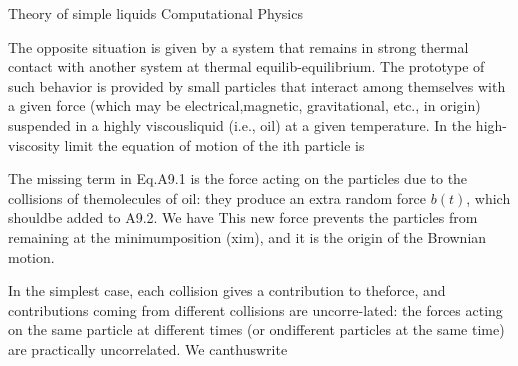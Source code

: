 \documentclass[../../main-notes.tex]{subfiles}
\begin{document}
Theory of simple liquids 
Computational Physics\citep{Thijssen2007}

The opposite situation is given by a system that remains in strong thermal contact with another system at thermal equilib-equilibrium. 
The prototype of such behavior is provided by small particles that interact among themselves with a given force (which may be electrical,magnetic, gravitational, etc., in origin) suspended in a highly viscousliquid (i.e., oil) at a given temperature. 
In the high-viscosity limit the equation of motion of the ith particle is

 The missing term in Eq.A9.1 is the force acting on the particles due to the collisions of themolecules of oil: they produce an extra random force $b(t)$, which shouldbe added to A9.2. 
 We have
This new force prevents the particles from remaining at the minimumposition (xim), and it is the origin of the Brownian motion.

In the simplest case, each collision gives a contribution to theforce, and contributions coming from different collisions are uncorre-lated: the forces acting on the same particle at different times (or ondifferent particles at the same time) are practically uncorrelated. We canthuswrite
\end{document}
